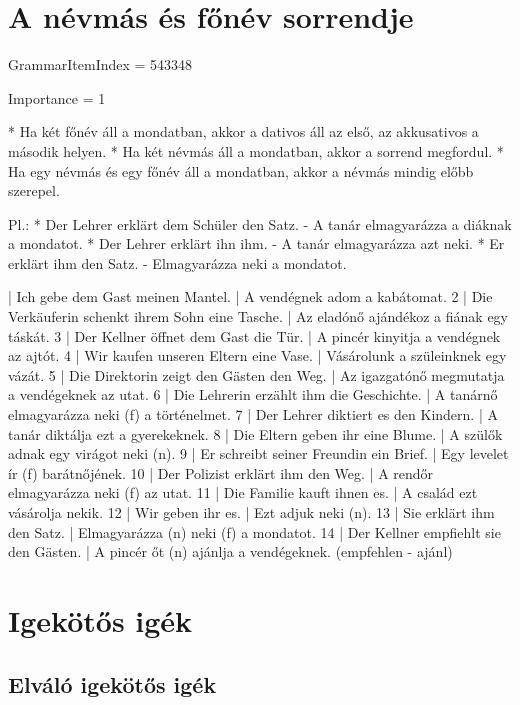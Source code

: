 \documentclass{article}
\newenvironment{desc}{\verbatim}{\endverbatim}
\newenvironment{exmp}{\verbatim}{\endverbatim}
\begin{document}
\section{A névmás és főnév sorrendje}

GrammarItemIndex = 543348

Importance = 1

\begin{desc}
* Ha két főnév áll a mondatban, akkor a dativos áll az első, az akkusativos a második helyen.
* Ha két névmás áll a mondatban, akkor a sorrend megfordul.
* Ha egy névmás és egy főnév áll a mondatban, akkor a névmás mindig előbb szerepel.

Pl.: * Der Lehrer erklärt dem Schüler den Satz. - A tanár elmagyarázza a diáknak a mondatot.
* Der Lehrer erklärt ihn ihm. - A tanár elmagyarázza azt neki.
* Er erklärt ihm den Satz. - Elmagyarázza neki a mondatot.
\end{desc}

\begin{exmp}
1 | Ich gebe dem Gast meinen Mantel. | A vendégnek adom a kabátomat.
2 | Die Verkäuferin schenkt ihrem Sohn eine Tasche. | Az eladónő ajándékoz a fiának egy táskát.
3 | Der Kellner öffnet dem Gast die Tür. | A pincér kinyitja a vendégnek az ajtót.
4 | Wir kaufen unseren Eltern eine Vase. | Vásárolunk a szüleinknek egy vázát.
5 | Die Direktorin zeigt den Gästen den Weg. | Az igazgatónő megmutatja a vendégeknek az utat.
6 | Die Lehrerin erzählt ihm die Geschichte. | A tanárnő elmagyarázza neki (f) a történelmet.
7 | Der Lehrer diktiert es den Kindern. | A tanár diktálja ezt a gyerekeknek.
8 | Die Eltern geben ihr eine Blume. | A szülők adnak egy virágot neki (n).
9 | Er schreibt seiner Freundin ein Brief. | Egy levelet ír (f) barátnőjének.
10 | Der Polizist erklärt ihm den Weg. | A rendőr elmagyarázza neki (f) az utat.
11 | Die Familie kauft ihnen es. | A család ezt vásárolja nekik.
12 | Wir geben ihr es. | Ezt adjuk neki (n).
13 | Sie erklärt ihm den Satz. | Elmagyarázza (n) neki (f) a mondatot.
14 | Der Kellner empfiehlt sie den Gästen. | A pincér őt (n) ajánlja a vendégeknek. (empfehlen - ajánl)
\end{exmp}

\section{Igekötős igék}

\subsection{Elváló igekötős igék}
\end{document}

